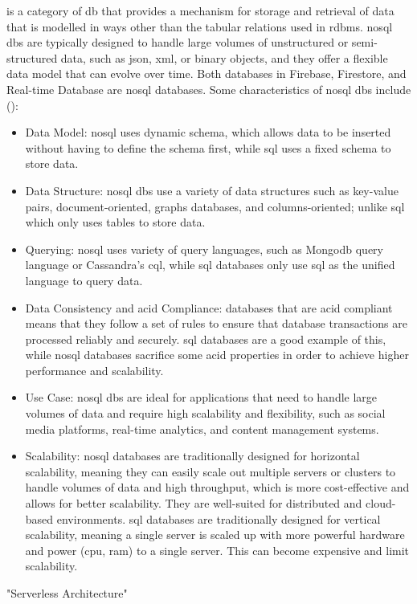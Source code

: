 \begin{multicols}{2}
      is a category of \acrshort{db} that provides a mechanism for storage and retrieval of data that is modelled in ways other
      than the tabular relations used in \acrshort{rdbms}. \acrshort{nosql} \acrshort{db}s are typically designed to handle large
      volumes of unstructured or semi-structured data, such as \acrshort{json}, \acrshort{xml}, or binary objects, and they offer
      a flexible data model that can evolve over time. Both databases in Firebase, Firestore, and Real-time Database are \acrshort{nosql}
      databases. Some characteristics of \acrshort{nosql} \acrshort{db}s include (\cite{nosql}):
      \begin{itemize}
            \item Data Model: \acrshort{nosql} uses dynamic schema, which allows data to be inserted without having to define the schema
                  first, while \acrshort{sql} uses a fixed schema to store data.
            \item Data Structure: \acrshort{nosql} \acrshort{db}s use a variety of data structures such as key-value pairs,
                  document-oriented, graphs databases, and columns-oriented; unlike \acrshort{sql} which only uses tables to store data.
            \item Querying: \acrshort{nosql} uses variety of query languages, such as Mongo\acrshort{db} query language or Cassandra's
                  \acrshort{cql}, while \acrshort{sql} databases only use \acrshort{sql} as the unified language to query data.
            \item Data Consistency and \acrshort{acid} Compliance: databases that are \acrshort{acid} compliant means that they follow a
                  set of rules to ensure that database transactions are processed reliably and securely. \acrshort{sql} databases are a
                  good example of this, while \acrshort{nosql} databases sacrifice some \acrshort{acid} properties in order to achieve
                  higher performance and scalability.
            \item Use Case: \acrshort{nosql} \acrshort{db}s are ideal for applications that need to handle large volumes of data and
                  require high scalability and flexibility, such as social media platforms, real-time analytics, and content management
                  systems.
            \item Scalability: \acrshort{nosql} databases are traditionally designed for horizontal scalability, meaning they can easily
                  scale out multiple servers or clusters to handle volumes of data and high throughput, which is more cost-effective and
                  allows for better scalability. They are well-suited for distributed and cloud-based environments. \acrshort{sql}
                  databases are traditionally designed for vertical scalability, meaning a single server is scaled up with more powerful
                  hardware and power (\acrshort{cpu}, \acrshort{ram}) to a single server. This can become expensive and limit scalability.
      \end{itemize}
      "Serverless Architecture"
\end{multicols}

